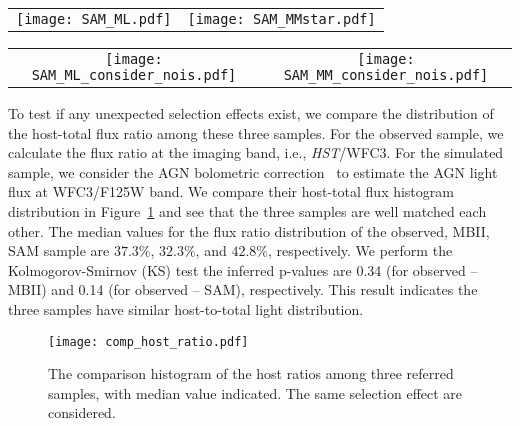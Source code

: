 \documentclass{natureprintstyle}
\newcommand{\hst}{{\it HST}}
\begin{document}
\begin{figure*}[t]%
\begin{tabular}{c c}
\texttt{[image: SAM\_ML.pdf]} &
\texttt{[image: SAM\_MMstar.pdf]} \\
\end{tabular}
\caption{Similar to the Figure~\ref{fig:MBII_comp}, but for a direct comparison to the observation using SAM's model. The blue background contours show the possibility distribution for the overall sample, and the red contours indicate the distributions after considering the selecting effect. We presented our observational data as yellow dots. Note that this comparison has not taken the measurement uncertainties into account yet. 
}
\label{fig:SAM_comp}
\end{figure*}

\begin{figure*}[t]%
\begin{tabular}{c c}
\texttt{[image: SAM\_ML\_consider\_nois.pdf]} &
\texttt{[image: SAM\_MM\_consider\_nois.pdf]} \\
\end{tabular}
\caption{Same as the Figure~\ref{fig:MBII_comp}, but for the SAM models.}
\label{fig:SAM_comp_withnoise}
\end{figure*}



To test if any unexpected selection effects exist, we compare the distribution of the host-total flux ratio among these three samples. For the observed sample, we calculate the flux ratio at the imaging band, i.e., \hst/WFC3. For the simulated sample, we consider the AGN bolometric correction~\cite{Elvis1994} to estimate the AGN light flux at WFC3/F125W band. We compare their host-total flux histogram distribution in Figure~\ref{fig:comp_hist} and see that the three samples are well matched each other. The median values for the flux ratio distribution of the observed, MBII, SAM sample are $37.3\%$, $32.3\%$, and $42.8\%$, respectively. We perform the Kolmogorov-Smirnov (KS) test the inferred p-values are 0.34 (for observed -- MBII) and 0.14 (for observed -- SAM), respectively. This result indicates the three samples have similar host-to-total light distribution.

\begin{figure}[t]
\texttt{[image: comp\_host\_ratio.pdf]}
\caption{The comparison histogram of the host ratios among three referred samples, with median value indicated. The same selection effect are considered.
}
\label{fig:comp_hist}
\end{figure}
\end{document}

